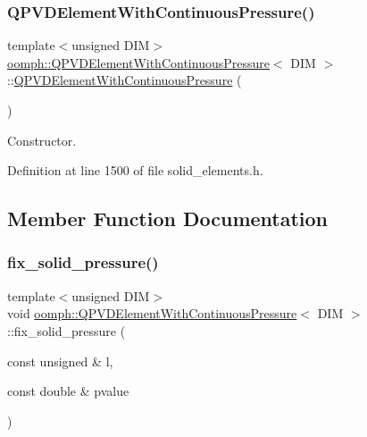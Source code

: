 \subsubsection{\texorpdfstring{Q\+P\+V\+D\+Element\+With\+Continuous\+Pressure()}{QPVDElementWithContinuousPressure()}}
{\footnotesize\ttfamily template$<$unsigned D\+IM$>$ \\
\hyperlink{classoomph_1_1QPVDElementWithContinuousPressure}{oomph\+::\+Q\+P\+V\+D\+Element\+With\+Continuous\+Pressure}$<$ D\+IM $>$\+::\hyperlink{classoomph_1_1QPVDElementWithContinuousPressure}{Q\+P\+V\+D\+Element\+With\+Continuous\+Pressure} (\begin{DoxyParamCaption}{ }\end{DoxyParamCaption})\hspace{0.3cm}{\ttfamily [inline]}}



Constructor. 



Definition at line 1500 of file solid\+\_\+elements.\+h.



\subsection{Member Function Documentation}
\mbox{\label{classoomph_1_1QPVDElementWithContinuousPressure_ac86b448b58ca42cab0561cce11bdbd7d}} 
\subsubsection{\texorpdfstring{fix\+\_\+solid\+\_\+pressure()}{fix\_solid\_pressure()}}
{\footnotesize\ttfamily template$<$unsigned D\+IM$>$ \\
void \hyperlink{classoomph_1_1QPVDElementWithContinuousPressure}{oomph\+::\+Q\+P\+V\+D\+Element\+With\+Continuous\+Pressure}$<$ D\+IM $>$\+::fix\+\_\+solid\+\_\+pressure (\begin{DoxyParamCaption}\item[{const unsigned \&}]{l,  }\item[{const double \&}]{pvalue }\end{DoxyParamCaption})\hspace{0.3cm}{\ttfamily [inline]}}




